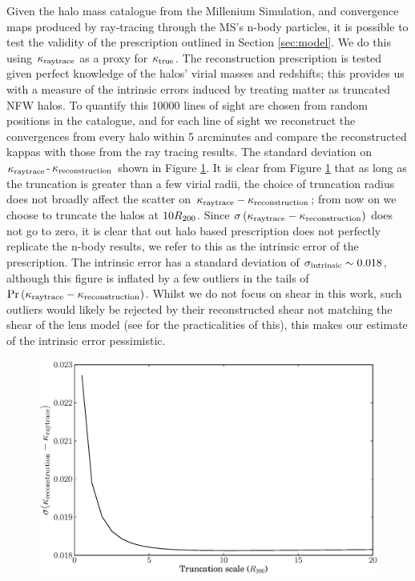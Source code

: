 \documentclass[useAMS,usenatbib]{mn2e}
\begin{document}
Given the halo mass catalogue from the Millenium Simulation, and convergence maps produced by
ray-tracing through the MS's n-body particles, 
it is possible to test the validity of the prescription outlined in Section \ref{sec:model}. We do this
using $\kappa_{\rm raytrace}$ as a proxy for $\kappa_{\rm true}$. The reconstruction prescription is tested given perfect
knowledge of the halos' virial masses and redshifts; this provides us with a measure of the intrinsic
errors induced by treating matter as truncated NFW halos. To quantify this 10000 lines of sight are chosen
from random positions in the catalogue, and for each line of sight we reconstruct the
convergences from every halo within 5 arcminutes and compare the reconstructed
kappas with those from the ray tracing results. The standard deviation on $\kappa_{\rm raytrace}$-$\kappa_{\rm reconstruction}$ 
shown in Figure \ref{fig:ScattervsTruncation}. It is clear from Figure \ref{fig:ScattervsTruncation} 
that as long as the truncation is greater than a few virial radii, the choice of truncation
radius does not broadly affect the scatter on $\kappa_{\rm raytrace}-\kappa_{\rm reconstruction}$; from now on we choose 
to truncate the halos at $10 R_{200}$. Since $\sigma\left(\kappa_{\rm raytrace}-\kappa_{\rm reconstruction}\right)$ does not go to
zero, it is clear that out halo based prescription does not perfectly replicate the n-body results, we refer to this
 as the intrinsic error of the prescription. The intrinsic error has a standard deviation of $\sigma_{\rm intrinsic} \sim 0.018$, although
this figure is inflated by a few outliers in the tails of ${\rm Pr}\left(\kappa_{\rm raytrace}-\kappa_{\rm reconstruction}\right)$. Whilst we do not
focus on shear in this work, such outliers would likely be rejected by their reconstructed shear not matching the
shear of the lens model (see \citet{wong} for the practicalities of this), this makes our estimate of the intrinsic error pessimistic.

\begin{figure}\label{fig:ScattervsTruncation}
\includegraphics[width=\columnwidth]{truncation_scatter.eps}
\caption[magcut]{}
\end{figure}
\end{document}
